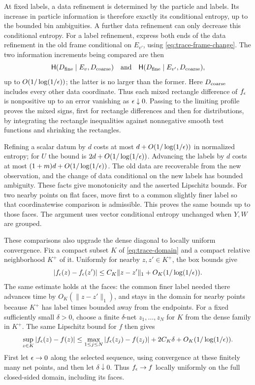 At fixed labels, a data refinement is determined by the particle and
labels.  Its increase in particle information is therefore exactly its
conditional entropy, up to the bounded bin ambiguities.  A further data
refinement can only decrease this conditional entropy.  For a label
refinement, express both ends of the data refinement in the old frame
conditional on $E_{v'}$, using \eqref{eq:trace-frame-change}.  The two
information increments being compared are then
\[
 \mathsf H(D_{\rm fine}\mid E_v,D_{\rm coarse})
 \quad\hbox{and}\quad
 \mathsf H(D_{\rm fine}\mid E_{v'},D_{\rm coarse}),
\]
up to $O(1/\log(1/\epsilon))$; the latter is no larger than the former.
Here $D_{\rm coarse}$ includes every other data coordinate.  Thus each
mixed rectangle difference of $f_\epsilon$ is nonpositive up to an error
vanishing as $\epsilon\downarrow0$.  Passing to the limiting profile proves
the mixed signs, first for rectangle differences and then for
distributions, by integrating the rectangle inequalities against
nonnegative smooth test functions and shrinking the rectangles.

Refining a scalar datum by $d$ costs at most
$d+O(1/\log(1/\epsilon))$ in normalized entropy; for $U$ the bound is
$2d+O(1/\log(1/\epsilon))$.  Advancing the labels by $d$ costs at most
$(1+m)d+O(1/\log(1/\epsilon))$.  The old data are recoverable from the new
observation, and the change of data conditional on the new labels has
bounded ambiguity.  These facts give monotonicity and the asserted
Lipschitz bounds.  For two nearby points on flat faces, move first to a
common slightly finer label so that coordinatewise comparison is
admissible.  This proves the same bounds up to those faces.  The argument
uses vector conditional entropy unchanged when $Y,W$ are grouped.

These comparisons also upgrade the dense diagonal to locally uniform
convergence.  Fix a compact subset $K$ of \eqref{eq:trace-domain} and a
compact relative neighborhood $K^+$ of it.  Uniformly for nearby
$z,z'\in K^+$, the box bounds give
\[
 |f_\epsilon(z)-f_\epsilon(z')|
 \le C_K\|z-z'\|_1+O_K(1/\log(1/\epsilon)).
\]
The same estimate holds at the faces: the common finer label needed
there advances time by $O_K(\|z-z'\|_1)$, and stays in the domain for
nearby points because $K^+$ has label times bounded away from the
endpoints.  For a fixed sufficiently small $\delta>0$, choose a finite
$\delta$-net $z_1,\ldots,z_N$ for $K$ from the dense family in $K^+$.  The same
Lipschitz bound for $f$ then gives
\[
 \sup_{z\in K}|f_\epsilon(z)-f(z)|
 \le \max_{1\le j\le N}|f_\epsilon(z_j)-f(z_j)|
       +2C_K\delta+O_K(1/\log(1/\epsilon)).
\]
First let $\epsilon\to0$ along the selected sequence, using convergence at
these finitely many net points, and then let $\delta\downarrow0$.
Thus $f_\epsilon\to f$ locally uniformly on the full closed-sided domain,
including its faces.

